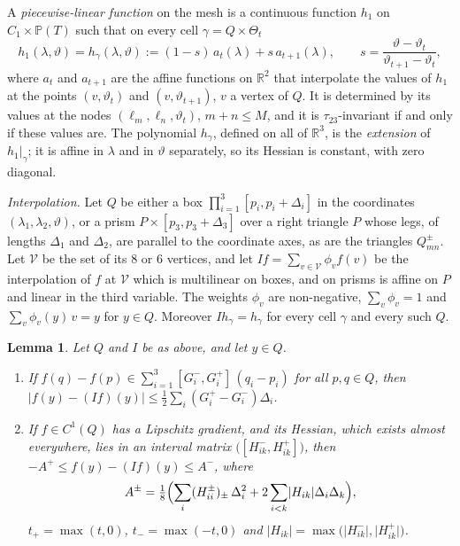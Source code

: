 \documentclass[11pt]{amsart}
\newtheorem{lemma}[proposition]{Lemma}
\theoremstyle{definition}
\theoremstyle{remark}
\newcommand{\R}{\mathbb R}
\newcommand{\abs}[1]{\lvert #1\rvert}
\newcommand{\PT}{\mathbb P(T)}
\begin{document}
A \emph{piecewise-linear function} on the mesh is a continuous function $h_1$ on $C_1\times\PT$ such that on every cell $\gamma=Q\times\Theta_t$
\[
  h_1(\lambda,\vartheta)=h_\gamma(\lambda,\vartheta):=(1-s)\,a_t(\lambda)+s\,a_{t+1}(\lambda),\qquad s=\frac{\vartheta-\vartheta_t}{\vartheta_{t+1}-\vartheta_t},
\]
where $a_t$ and $a_{t+1}$ are the affine functions on $\R^2$ that interpolate the values of $h_1$ at the points $(v,\vartheta_t)$ and $(v,\vartheta_{t+1})$, $v$ a vertex of $Q$. It is determined by its values at the nodes $(\ell_m,\ell_n,\vartheta_t)$, $m+n\le M$, and it is $\tau_{23}$-invariant if and only if these values are. The polynomial $h_\gamma$, defined on all of $\R^3$, is the \emph{extension} of $h_1|_\gamma$; it is affine in $\lambda$ and in $\vartheta$ separately, so its Hessian is constant, with zero diagonal.

\emph{Interpolation.} Let $Q$ be either a box $\prod_{i=1}^3[p_i,p_i+\Delta_i]$ in the coordinates $(\lambda_1,\lambda_2,\vartheta)$, or a prism $P\times[p_3,p_3+\Delta_3]$ over a right triangle $P$ whose legs, of lengths $\Delta_1$ and $\Delta_2$, are parallel to the coordinate axes, as are the triangles $Q^\pm_{mn}$. Let $\mathcal V$ be the set of its $8$ or $6$ vertices, and let $If=\sum_{v\in\mathcal V}\phi_vf(v)$ be the interpolation of $f$ at $\mathcal V$ which is multilinear on boxes, and on prisms is affine on $P$ and linear in the third variable. The weights $\phi_v$ are non-negative, $\sum_v\phi_v=1$ and $\sum_v\phi_v(y)\,v=y$ for $y\in Q$. Moreover $Ih_\gamma=h_\gamma$ for every cell $\gamma$ and every such $Q$.

\begin{lemma}\label{lem:interp}
Let $Q$ and $I$ be as above, and let $y\in Q$.
\begin{enumerate}
\item[(i)] If $f(q)-f(p)\in\sum_{i=1}^3[G_i^-,G_i^+]\,(q_i-p_i)$ for all $p,q\in Q$, then
$\abs{f(y)-(If)(y)}\le\frac12\sum_i(G_i^+-G_i^-)\Delta_i$.
\item[(ii)] If $f\in C^1(Q)$ has a Lipschitz gradient, and its Hessian, which exists almost everywhere, lies in an interval matrix $\bigl([H_{ik}^-,H_{ik}^+]\bigr)$, then $-A^+\le f(y)-(If)(y)\le A^-$, where
\[
  A^\pm=\tfrac18\Bigl(\sum_i(H_{ii}^\pm)_\pm\,\Delta_i^2+2\sum_{i<k}\abs{H_{ik}}\Delta_i\Delta_k\Bigr),
\]
$t_+=\max(t,0)$, $t_-=\max(-t,0)$ and $\abs{H_{ik}}=\max\bigl(\abs{H_{ik}^-},\abs{H_{ik}^+}\bigr)$.
\end{enumerate}
\end{lemma}
\end{document}
